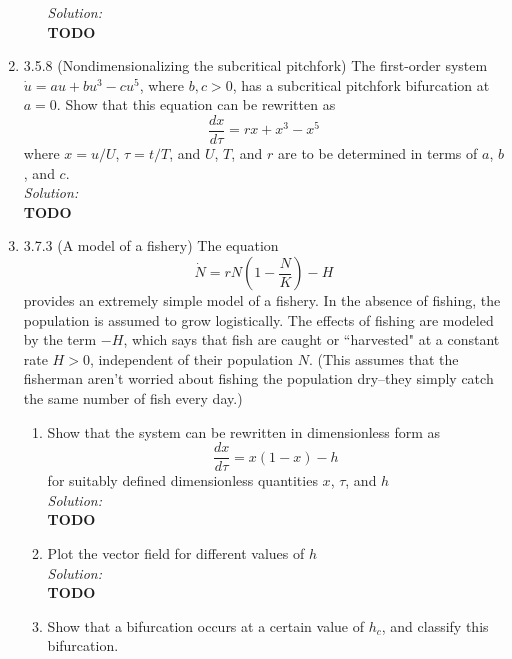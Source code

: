 \documentclass[10pt]{amsart}
\theoremstyle{nonumberplain}
\begin{document}
\begin{enumerate}[label={\bf {\arabic*}:}]
\begin{enumerate}
\noindent
\textit{Solution:} \\
\textbf{TODO} \\

\end{enumerate}

\item 3.5.8 (Nondimensionalizing the subcritical pitchfork) The first-order system $\dot u = au + bu^3 - c u^5$, where $b, c > 0$, has a subcritical pitchfork bifurcation at $a = 0$.
Show that this equation can be rewritten as
$$\frac {dx}{d\tau} = r x + x^3 - x^5$$
where $x = u/U$, $\tau = t/T$, and $U$, $T$, and $r$ are to be determined in terms of $a$, $b$, and $c$. \\

\noindent
\textit{Solution:} \\
\textbf{TODO} \\

\newpage

\item 3.7.3 (A model of a fishery) The equation
$$\dot N = rN\left( 1 - \frac N K \right) - H$$
provides an extremely simple model of a fishery.
In the absence of fishing, the population is assumed to grow logistically. 
The effects of fishing are modeled by the term $-H$, which says that fish are caught or ``harvested" at a constant rate $H > 0$, independent of their population $N$.
(This assumes that the fisherman aren't worried about fishing the population dry--they simply catch the same number of fish every day.) \\

\begin{enumerate}

\item Show that the system can be rewritten in dimensionless form as 
$$
\frac {dx}{d\tau} = x(1 - x) - h
$$
for suitably defined dimensionless quantities $x$, $\tau$, and $h$ \\

\noindent
\textit{Solution:} \\
\textbf{TODO} \\

\item Plot the vector field for different values of $h$ \\

\noindent
\textit{Solution:} \\
\textbf{TODO} \\

\item Show that a bifurcation occurs at a certain value of $h_c$, and classify this bifurcation. \\


\end{enumerate}
\end{enumerate}
\end{document}
